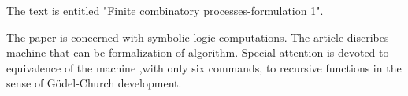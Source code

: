 \documentclass[a4paper, 14pt]{extarticle}
\begin{document}
The text is entitled "Finite combinatory processes-formulation 1".

The paper is concerned with symbolic logic computations.
The article discribes machine that can be formalization of algorithm.
Special attention is devoted to equivalence of the machine ,with only six commands, to recursive
functions in the sense of G{\"o}del-Church development.
\end{document}
